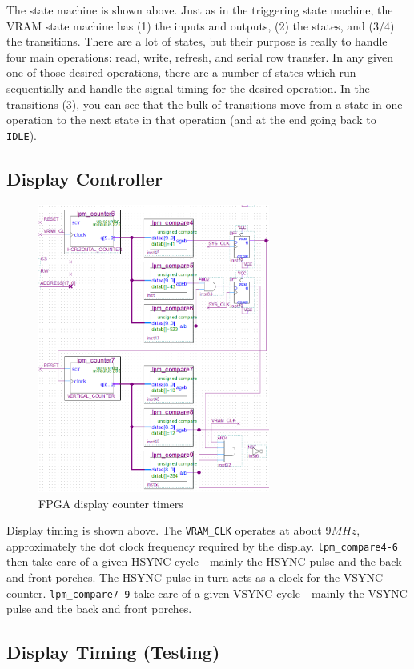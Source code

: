 The state machine is shown above. Just as in the triggering state machine, the VRAM state machine has (1) the inputs and outputs, (2) the states, and (3/4) the transitions. There are a lot of states, but their purpose is really to handle four main operations: read, write, refresh, and serial row transfer. In any given one of those desired operations, there are a number of states which run sequentially and handle the signal timing for the desired operation. In the transitions (3), you can see that the bulk of transitions move from a state in one operation to the next state in that operation (and at the end going back to \verb=IDLE=).

\subsection{Display Controller}

\begin{figure}[ht!]
    \centering
    \includegraphics[width=3in]{fpga_logic/vram_disp_counters.png}
		\caption{FPGA display counter timers}
\end{figure}

Display timing is shown above. The \verb=VRAM_CLK= operates at about $9MHz$, approximately the dot clock frequency required by the display. \verb=lpm_compare4-6= then take care of a given HSYNC cycle - mainly the HSYNC pulse and the back and front porches. The HSYNC pulse in turn acts as a clock for the VSYNC counter. \verb=lpm_compare7-9= take care of a given VSYNC cycle - mainly the VSYNC pulse and the back and front porches.

\subsection{Display Timing (Testing)}

